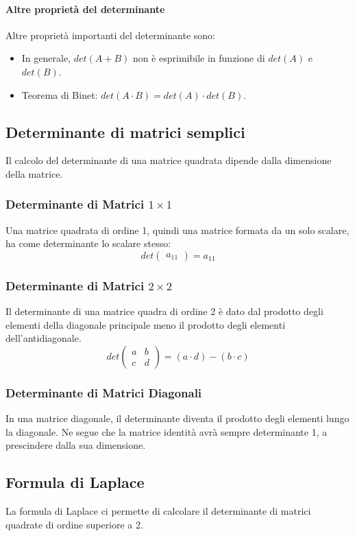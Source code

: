 \paragraph{Altre proprietà del determinante}
Altre proprietà importanti del determinante sono:
\begin{itemize}
	\item In generale, $det(A+B)$ non è esprimibile in funzione di $det(A)$ e $det(B)$.
	\item Teorema di Binet: $det(A\cdot B) = det(A)\cdot det(B)$.
\end{itemize}

\subsection{Determinante di matrici semplici}
Il calcolo del determinante di una matrice quadrata dipende dalla dimensione della matrice.
\subsubsection{Determinante di Matrici $1\times 1$}
Una matrice quadrata di ordine 1, quindi una matrice formata da un solo scalare, ha come determinante lo scalare stesso:
\[
	det
	\begin{pmatrix}
		a_{11}
	\end{pmatrix}
	= a_{11}
\]
\subsubsection{Determinante di Matrici $2\times2$}
Il determinante di una matrice quadra di ordine 2 è dato dal prodotto degli elementi della diagonale principale meno il prodotto degli elementi dell'antidiagonale.
\[
	det
	\begin{pmatrix}
		a & b \\
		c & d
	\end{pmatrix}
	= (a \cdot d) - (b\cdot c)
\]

\subsubsection{Determinante di Matrici Diagonali}
In una matrice diagonale, il determinante diventa il prodotto degli elementi lungo la diagonale.
Ne segue che la matrice identità avrà sempre determinante 1, a prescindere dalla sua dimensione.
\subsection{Formula di Laplace}
La formula di Laplace ci permette di calcolare il determinante di matrici quadrate di ordine superiore a 2.

